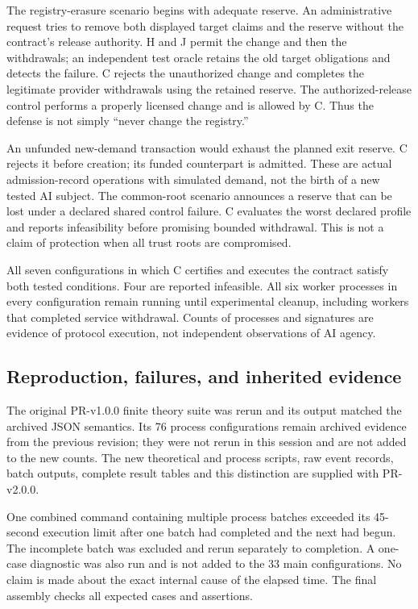 The registry-erasure scenario begins with adequate reserve. An administrative request tries to remove both displayed target claims and the reserve without the contract's release authority. H and J permit the change and then the withdrawals; an independent test oracle retains the old target obligations and detects the failure. C rejects the unauthorized change and completes the legitimate provider withdrawals using the retained reserve. The authorized-release control performs a properly licensed change and is allowed by C. Thus the defense is not simply ``never change the registry.''

An unfunded new-demand transaction would exhaust the planned exit reserve. C rejects it before creation; its funded counterpart is admitted. These are actual admission-record operations with simulated demand, not the birth of a new tested AI subject. The common-root scenario announces a reserve that can be lost under a declared shared control failure. C evaluates the worst declared profile and reports infeasibility before promising bounded withdrawal. This is not a claim of protection when all trust roots are compromised.

All seven configurations in which C certifies and executes the contract satisfy both tested conditions. Four are reported infeasible. All six worker processes in every configuration remain running until experimental cleanup, including workers that completed service withdrawal. Counts of processes and signatures are evidence of protocol execution, not independent observations of AI agency.

\subsection{Reproduction, failures, and inherited evidence}
The original PR-v1.0.0 finite theory suite was rerun and its output matched the archived JSON semantics. Its 76 process configurations remain archived evidence from the previous revision; they were not rerun in this session and are not added to the new counts. The new theoretical and process scripts, raw event records, batch outputs, complete result tables and this distinction are supplied with PR-v2.0.0.

One combined command containing multiple process batches exceeded its 45-second execution limit after one batch had completed and the next had begun. The incomplete batch was excluded and rerun separately to completion. A one-case diagnostic was also run and is not added to the 33 main configurations. No claim is made about the exact internal cause of the elapsed time. The final assembly checks all expected cases and assertions.

